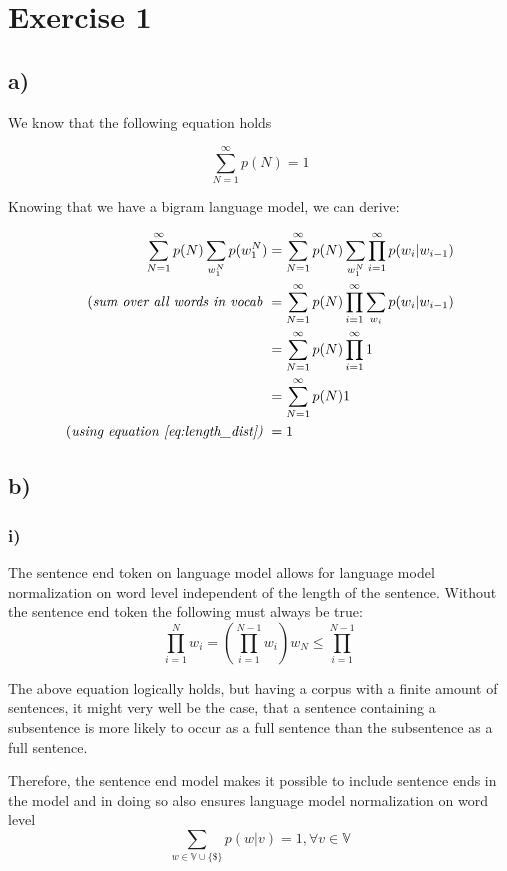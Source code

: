 \section*{Exercise 1} %
\label{sec:section_name}

\subsection*{a)} %
\label{sub:a}

We know that the following equation holds

\begin{equation} \label{eq:length_dist}
	\sum_{N=1}^{\infty} p(N) = 1
\end{equation}

Knowing that we have a bigram language model, we can derive: 

\begin{align*}
	\sum_{N=1}^{\infty} p(N) \sum_{w_1^{N}} p(w_1^{N}) &= \sum_{N=1}^{\infty} p(N) \sum_{w_1^{N}} \prod_{i = 1}^{\infty} p(w_i|w_{i-1}) \\ 
	\text{(\textit{sum over all words in vocab} }	&= \sum_{N=1}^{\infty} p(N) \prod_{i = 1}^{\infty} \sum_{w_i}  p(w_i|w_{i-1}) \\ 
	&= \sum_{N=1}^{\infty} p(N) \prod_{i = 1}^{\infty} 1 \\ 
	&= \sum_{N=1}^{\infty} p(N) 1 \\ 
	\text{(\textit{using equation \ref{eq:length_dist})} }	&= 1 
\end{align*}

\subsection*{b)} %
\label{sub:b}

\subsubsection*{i)}%
\label{ssub:i_}

The sentence end token on language model allows for language model 
normalization on word level independent of the length of the sentence. 
Without the sentence end token the following must always be true: 
\[
	\prod_{i=1}^{N} w_i = (\prod_{i=1}^{N-1} w_i) w_N \le \prod_{i=1}^{N-1}
\]

The above equation logically holds, but having a corpus with a finite 
amount of sentences, it might very well be the case, that a sentence containing 
a subsentence is more likely to occur as a full sentence than the subsentence 
as a full sentence. 

Therefore, the sentence end model makes it possible to include sentence ends 
in the model and in doing so also ensures language model normalization on word 
level 
\[
	\sum_{w \in \mathbb{V} \cup \{\$\}} p(w|v) = 1, \forall v \in \mathbb{V}
\]


